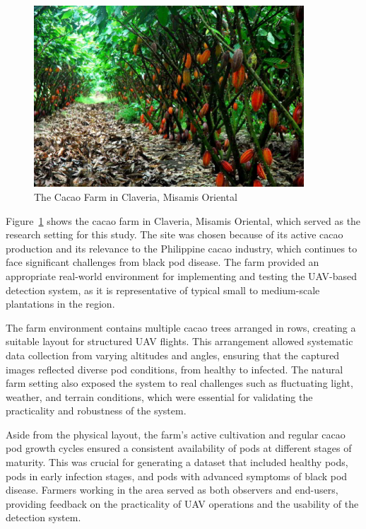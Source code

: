 \begin{figure}[H]
	\centering
	\caption{The Cacao Farm in Claveria, Misamis Oriental}
	\label{fig:cacao_farm}
	\includegraphics[width=0.9\textwidth]{figures/Cacao_Farm.pdf}
\end{figure}


Figure~\ref{fig:cacao_farm} shows the cacao farm in Claveria, Misamis Oriental, which served as the research setting for this study.
The site was chosen because of its active cacao production and its relevance to the Philippine cacao industry, which continues to face significant challenges from black pod disease. The farm provided an appropriate real-world environment for implementing and testing the UAV-based detection system, as it is representative of typical small to medium-scale plantations in the region.

The farm environment contains multiple cacao trees arranged in rows, creating a suitable layout for structured UAV flights.
This arrangement allowed systematic data collection from varying altitudes and angles, ensuring that the captured images reflected diverse pod conditions, from healthy to infected.
The natural farm setting also exposed the system to real challenges such as fluctuating light, weather, and terrain conditions, which were essential for validating the practicality and robustness of the system.

Aside from the physical layout, the farm’s active cultivation and regular cacao pod growth cycles ensured a consistent availability of pods at different stages of maturity.
This was crucial for generating a dataset that included healthy pods, pods in early infection stages, and pods with advanced symptoms of black pod disease.
Farmers working in the area served as both observers and end-users, providing feedback on the practicality of UAV operations and the usability of the detection system.

